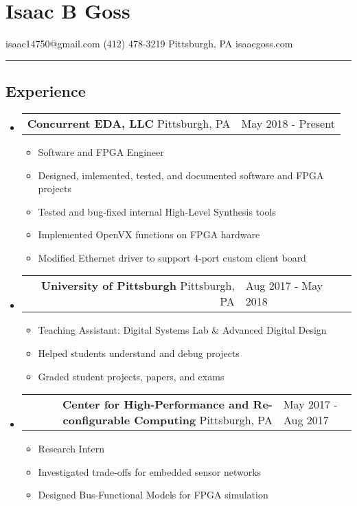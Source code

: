 \documentclass[18pt]{article}
\makeatletter
\providecommand{\tightlist}{
    \setlength{\itemsep}{0pt}\setlength{\parskip}{0pt}
}
\providecommand{\datetable}[2]{
    \begin{tabular*}{\textwidth}{@{}r @{\extracolsep{\fill}} l}
        #1 & #2
    \end{tabular*}
}
\makeatother
\begin{document}
    \section*{Isaac B Goss}\label{isaac-b-goss}
    isaac14750@gmail.com \textbar{} (412) 478-3219 \textbar{} Pittsburgh, PA \textbar{} isaacgoss.com
    
    \hrule

    \subsection*{Experience}\label{experience}
    \begin{itemize}[label={}]

        \item \datetable{
            \textbf{Concurrent EDA, LLC} \textbar{} Pittsburgh, PA
        }{May 2018 - Present}
        \begin{itemize}[topsep=0pt]\tightlist
            \item Software and FPGA Engineer
            \item Designed, imlemented, tested, and documented software and FPGA projects
            \item Tested and bug-fixed internal High-Level Synthesis tools
            \item Implemented OpenVX functions on FPGA hardware
            \item Modified Ethernet driver to support 4-port custom client board
        \end{itemize}

        \item \datetable{
            \textbf{University of Pittsburgh} \textbar{} Pittsburgh, PA
        }{Aug 2017 - May 2018}
        \begin{itemize}[topsep=0pt]\tightlist
            \item Teaching Assistant: Digital Systems Lab \& Advanced Digital Design
            \item Helped students understand and debug projects
            \item Graded student projects, papers, and exams
        \end{itemize}

        \item \datetable{
            \textbf{Center for High-Performance and Re-configurable Computing} \textbar{} Pittsburgh, PA
        }{May 2017 - Aug 2017}
        \begin{itemize}[topsep=0pt]\tightlist
            \item Research Intern
            \item Investigated trade-offs for embedded sensor networks
            \item Designed Bus-Functional Models for FPGA simulation
      	\end{itemize}

    \end{itemize}
\end{document}
